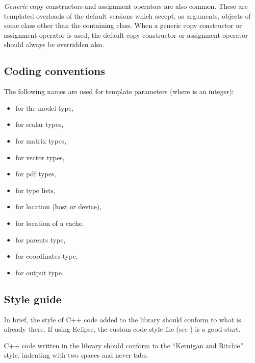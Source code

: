 \emph{Generic} copy constructors and assignment operators are also
common. These are templated overloads of the default versions which accept, as
arguments, objects of some class other than the containing class. When a
generic copy constructor or assignment operator is used, the default copy
constructor or assignment operator should always be overridden also.

\subsection{Coding conventions}

The following names are used for template parameters (where  is an
integer):
\begin{itemize}
\item {} for the model type,
\item {} for scalar types,
\item {} for matrix types,
\item {} for vector types,
\item {} for pdf types,
\item {} for type lists,
\item {} for location (host or device),
\item {} for location of a cache,
\item {} for parents type,
\item {} for coordinates type,
\item {} for output type.
\end{itemize}

\subsection{Style guide}

In brief, the style of C++ code added to the library should conform to what is
already there. If using Eclipse, the custom code style file (see
) is a good start.

C++ code written in the library should conform to the ``Kernigan and Ritchie''
style, indenting with two spaces and never tabs.
